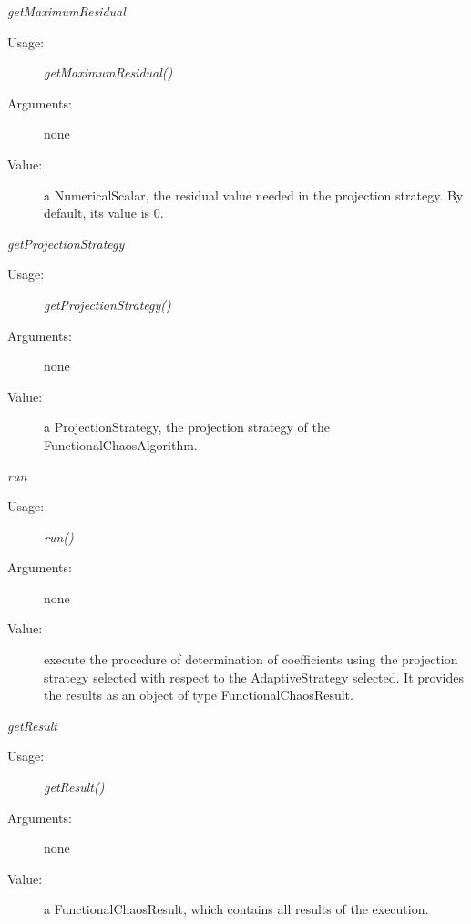 \begin{description}
\item[Some methods :]  \rule{0pt}{1em}
\begin{description}

\item \textit{getMaximumResidual}
\begin{description}
\item[Usage:] \textit{getMaximumResidual()}
\item[Arguments:] none
\item[Value:] a NumericalScalar, the residual value needed in the projection strategy. By default, its value is 0.
\end{description}
\bigskip



\item \textit{getProjectionStrategy}
\begin{description}
\item[Usage:] \textit{getProjectionStrategy()}
\item[Arguments:] none
\item[Value:] a ProjectionStrategy, the projection strategy of the FunctionalChaosAlgorithm.
\end{description}
\bigskip


\item \textit{run}
\begin{description}
\item[Usage:] \textit{run()}
\item[Arguments:] none
\item[Value:] execute the procedure of determination of coefficients using the projection strategy selected with respect to the AdaptiveStrategy selected. It provides the results as an object of type FunctionalChaosResult.
\end{description}
\bigskip
\item \textit{getResult}
\begin{description}
\item[Usage:] \textit{getResult()}
\item[Arguments:] none
\item[Value:] a FunctionalChaosResult, which contains all results of the execution.
\end{description}

\end{description}

\end{description}



